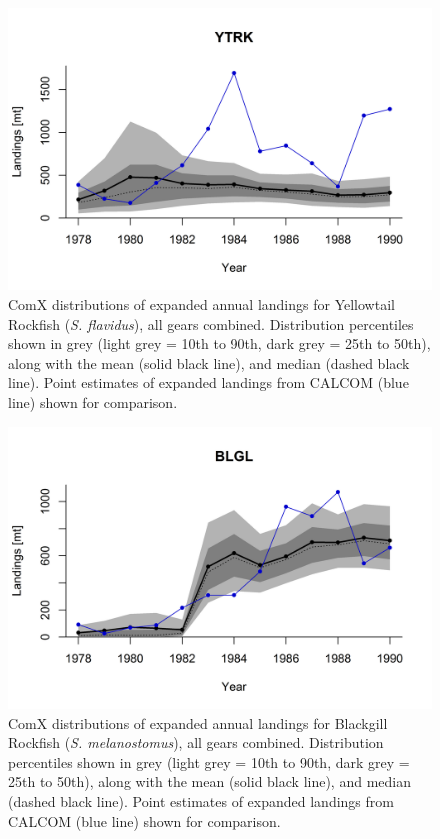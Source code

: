 \documentclass[12pt]{article}
\begin{document}
%
\clearpage
%

\begin{landscape}
\begin{figure}
\centering
\vspace{-2cm}
\includegraphics[width=1.3\textwidth]{./pictures/sp-yr/YTRK.png}
\caption{ComX distributions of expanded annual landings for Yellowtail Rockfish 
(\textit{S. flavidus}), all gears combined. Distribution percentiles shown in grey 
(light grey = 10th to 90th, dark grey = 25th to 50th), along with the mean 
(solid black line), and median (dashed black line). Point estimates of 
expanded landings from CALCOM (blue line) shown for comparison.}
\label{Y5}
\end{figure}
\end{landscape}

%
\clearpage
%

\begin{landscape}
\begin{figure}
\centering
\vspace{-2cm}
\includegraphics[width=1.3\textwidth]{./pictures/sp-yr/BLGL.png}
\caption{ComX distributions of expanded annual landings for Blackgill Rockfish 
(\textit{S. melanostomus}), all gears combined. Distribution percentiles shown in grey 
(light grey = 10th to 90th, dark grey = 25th to 50th), along with the mean 
(solid black line), and median (dashed black line). Point estimates of 
expanded landings from CALCOM (blue line) shown for comparison.}
\label{Y6}
\end{figure}
\end{landscape}
\end{document}
